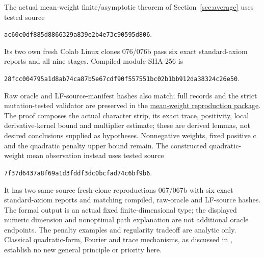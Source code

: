 \documentclass[11pt]{article}
\begin{document}
The actual mean-weight finite/asymptotic theorem of Section~\ref{sec:average}
uses tested source
\begin{center}\small\texttt{ac60c0df885d8866329a839e2b4e73c90595d806}.\end{center}
Its two own fresh Colab Linux clones 076/076b pass six exact standard-axiom
reports and all nine stages. Compiled module SHA-256 is
\begin{center}\small\texttt{28fcc004795a1d8ab74ca87b5e67cdf90f557551bc02b1bb912da38324c26e50}.\end{center}
Raw oracle and LF-source-manifest hashes also match; full records and the
strict mutation-tested validator are preserved in the
\href{https://github.com/lluiseriksson/THE-ERIKSSON-PROGRAMME/tree/c3f2b1d31e50b37e44d895e0b08ee834bd6af488/reproducibility/average-weight-rank-divergence-20261031}{mean-weight reproduction package}.
The proof composes the actual character strip, its exact trace, positivity,
local derivative-kernel bound and multiplier estimate; these are derived
lemmas, not desired conclusions supplied as hypotheses. Nonnegative
weights, fixed positive c and the quadratic penalty upper bound remain.
The constructed quadratic-weight mean observation instead uses tested source
\begin{center}\small\texttt{7f37d6437a8f69a1d3fddf3dc0bcfad74c6bf9b6}.\end{center}
It has two same-source fresh-clone reproductions 067/067b with six exact
standard-axiom reports and matching compiled, raw-oracle and LF-source hashes.
The formal output is an actual fixed finite-dimensional type; the displayed
numeric dimension and nonoptimal path explanation are not additional oracle
endpoints. The penalty examples and regularity tradeoff are analytic only.
Classical quadratic-form, Fourier and trace mechanisms, as discussed in
\cite{spielman}, establish no new general principle or priority here.
\end{document}

